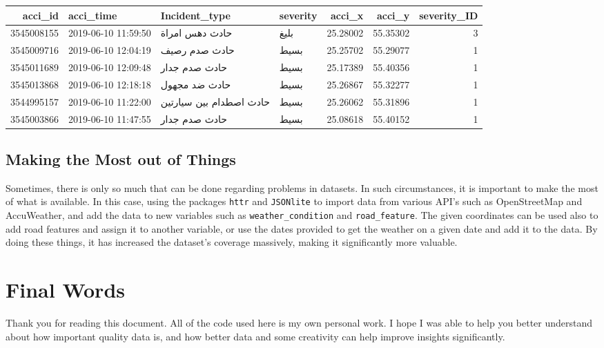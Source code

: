 \documentclass[
]{book}
\begin{document}
\begin{tabular}{r|l|l|l|r|r|r}
\hline
acci\_id & acci\_time & Incident\_type & severity & acci\_x & acci\_y & severity\_ID\\
\hline
3545008155 & 2019-06-10 11:59:50 & حادث دهس امراة & بليغ & 25.28002 & 55.35302 & 3\\
\hline
3545009716 & 2019-06-10 12:04:19 & حادث صدم رصيف & بسيط & 25.25702 & 55.29077 & 1\\
\hline
3545011689 & 2019-06-10 12:09:48 & حادث صدم جدار & بسيط & 25.17389 & 55.40356 & 1\\
\hline
3545013868 & 2019-06-10 12:18:18 & حادث ضد مجهول & بسيط & 25.26867 & 55.32277 & 1\\
\hline
3544995157 & 2019-06-10 11:22:00 & حادث اصطدام بين سيارتين & بسيط & 25.26062 & 55.31896 & 1\\
\hline
3545003866 & 2019-06-10 11:47:55 & حادث صدم جدار & بسيط & 25.08618 & 55.40152 & 1\\
\hline
\end{tabular}

\hypertarget{making-the-most-out-of-things}{%
\section{Making the Most out of Things}\label{making-the-most-out-of-things}}

Sometimes, there is only so much that can be done regarding problems in datasets. In such circumstances, it is important to make the most of what is available. In this case, using the packages \texttt{httr} and \texttt{JSONlite} to import data from various API's such as OpenStreetMap and AccuWeather, and add the data to new variables such as \texttt{weather\_condition} and \texttt{road\_feature}. The given coordinates can be used also to add road features and assign it to another variable, or use the dates provided to get the weather on a given date and add it to the data. By doing these things, it has increased the dataset's coverage massively, making it significantly more valuable.

\hypertarget{final-words}{%
\chapter{Final Words}\label{final-words}}

Thank you for reading this document. All of the code used here is my own personal work. I hope I was able to help you better understand about how important quality data is, and how better data and some creativity can help improve insights significantly.

  
\end{document}
